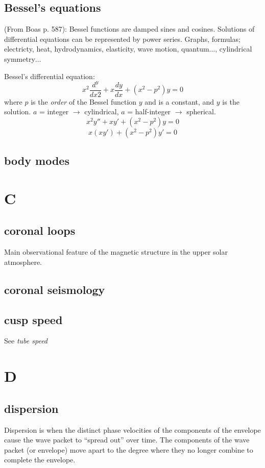 \documentclass[12pt]{article}
\begin{document}
\subsection*{Bessel's equations}

(From Boas p. 587): Bessel functions are damped sines and cosines.
Solutions of differential equations can be represented by power series.
Graphs, formulas; electricty, heat, hydrodynamics, elasticity, wave motion,
quantum$\ldots$, cylindrical symmetry$\ldots$

Bessel's differential equation:
$$ x^2\frac{d^y}{dx2} + x\frac{dy}{dx} + (x^2-p^2)y = 0 $$
where $p$ is the \emph{order} of the Bessel function $y$ and is a constant, and
$y$ is the solution.
$a$ = integer $\rightarrow$ cylindrical,
$a$ = half-integer $\rightarrow$ spherical.
$$ x^2y'' + xy' + (x^2-p^2)y = 0  $$
$$ x(xy') + (x^2-p^2)y' = 0  $$

\subsection*{body modes}

\section*{C}

\subsection*{coronal loops}
\begin{itemize*}
    \item Main observational feature of the magnetic structure in the
        upper solar atmosphere.
\end{itemize*}

\subsection*{coronal seismology}


\subsection*{cusp speed}
See \emph{tube speed}

\section*{D}

\subsection*{dispersion}
Dispersion is when the distinct phase velocities of the components of the
envelope cause the wave packet to ``spread out'' over time.
The components of the wave packet (or envelope) move apart to the degree
where they no longer combine to complete the envelope.
\end{document}

